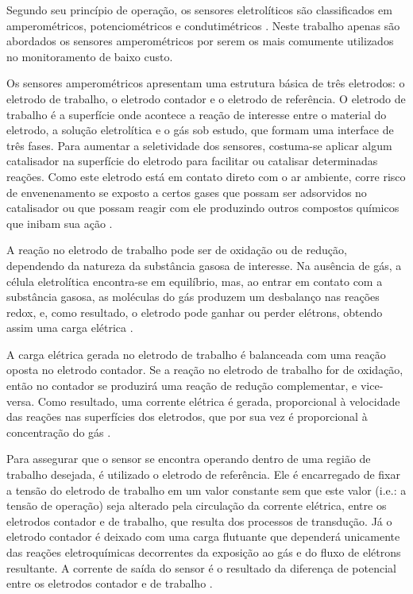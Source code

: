 Segundo seu princípio de operação, os sensores eletrolíticos são classificados em amperométricos, potenciométricos e condutimétricos \cite{R.Stetter2008AmperometricReview}. Neste trabalho apenas são abordados os sensores amperométricos por serem os mais comumente utilizados no monitoramento de baixo custo.

Os sensores amperométricos apresentam uma estrutura básica de três eletrodos: o eletrodo de trabalho, o eletrodo contador e o eletrodo de referência. O eletrodo de trabalho é a superfície onde acontece a reação de interesse entre o material do eletrodo, a solução eletrolítica e o gás sob estudo, que formam uma interface de três fases. Para aumentar a seletividade dos sensores, costuma-se aplicar algum catalisador na superfície do eletrodo para facilitar ou catalisar determinadas reações. Como este eletrodo está em contato direto com o ar ambiente, corre risco de envenenamento se exposto a certos gases que possam ser adsorvidos no catalisador ou que possam reagir com ele produzindo outros compostos químicos que inibam sua ação \cite{Alphasense2013AlphasenseWork, Westbroek2005FundamentalsElectrochemistry, R.Stetter2008AmperometricReview,Baron2017AmperometricReview}.

A reação no eletrodo de trabalho pode ser de oxidação ou de redução, dependendo da natureza da substância gasosa de interesse. Na ausência de gás, a célula eletrolítica encontra-se em equilíbrio, mas, ao entrar em contato com a substância gasosa, as moléculas do gás produzem um desbalanço nas reações redox, e, como resultado, o eletrodo pode ganhar ou perder elétrons, obtendo assim uma carga elétrica \cite{Alphasense2013AlphasenseWork,R.Stetter2008AmperometricReview}.

A carga elétrica gerada no eletrodo de trabalho é balanceada com uma reação oposta no eletrodo contador. Se a reação no eletrodo de trabalho for de oxidação, então no contador se produzirá uma reação de redução complementar, e vice-versa. Como resultado, uma corrente elétrica é gerada, proporcional à velocidade das reações nas superfícies dos eletrodos, que por sua vez é proporcional à concentração do gás \cite{Alphasense2013AlphasenseWork,R.Stetter2008AmperometricReview,Westbroek2005FundamentalsElectrochemistry}.

Para assegurar que o sensor se encontra operando dentro de uma região de trabalho desejada, é utilizado o eletrodo de referência. Ele é encarregado de fixar a tensão do eletrodo de trabalho em um valor constante sem que este valor (i.e.: a tensão de operação) seja alterado pela circulação da corrente elétrica, entre os eletrodos contador e de trabalho, que resulta dos processos de transdução. Já o eletrodo contador é deixado com uma carga flutuante que dependerá unicamente das reações eletroquímicas decorrentes da exposição ao gás e do fluxo de elétrons resultante. A corrente de saída do sensor é o resultado da diferença de potencial entre os eletrodos contador e de trabalho \cite{Alphasense2013AlphasenseWork,Baron2017AmperometricReview}.

